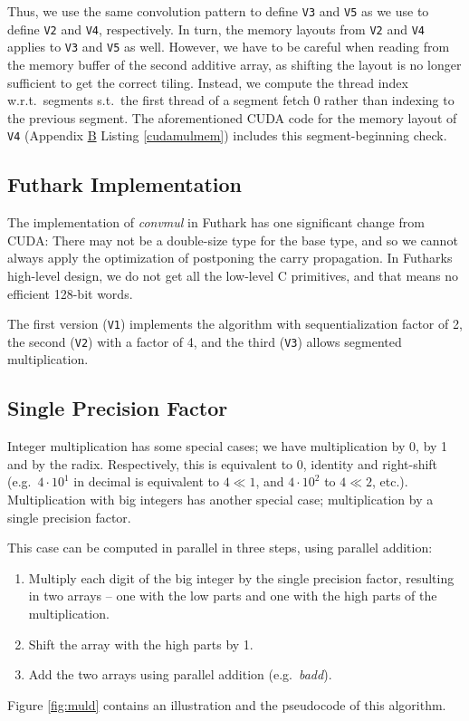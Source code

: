 Thus, we use the same convolution pattern to define \texttt{V3} and \texttt{V5}
as we use to define \texttt{V2} and \texttt{V4}, respectively. In turn, the
memory layouts from \texttt{V2} and \texttt{V4} applies to \texttt{V3} and
\texttt{V5} as well. However, we have to be careful when reading from the memory
buffer of the second additive array, as shifting the layout is no longer
sufficient to get the correct tiling. Instead, we compute the thread index
w.r.t.\ segments s.t.\ the first thread of a segment fetch $0$ rather than
indexing to the previous segment. The aforementioned CUDA code for the memory
layout of \texttt{V4} (Appendix \hyperref[app:B]{B} Listing \ref{cudamulmem})
includes this segment-beginning check.

\subsection{Futhark Implementation}
\label{subsec:mulfut}
{}

The implementation of \textit{convmul} in Futhark has one significant change
from CUDA: There may not be a double-size type for the base type, and so we
cannot always apply the optimization of postponing the carry propagation. In
Futharks high-level design, we do not get all the low-level C primitives, and
that means no efficient 128-bit words.

The first version (\texttt{V1}) implements the algorithm with sequentialization
factor of 2, the second (\texttt{V2}) with a factor of 4, and the third
(\texttt{V3}) allows segmented multiplication.

\subsection{Single Precision Factor}
\label{subsec:mulsin}

Integer multiplication has some special cases; we have multiplication by 0, by 1
and by the radix. Respectively, this is equivalent to 0, identity and
right-shift (e.g.\ $4 \cdot 10^1$ in decimal is equivalent to $4 \ll 1$, and
$4\cdot 10^2$ to $4\ll 2$, etc.). Multiplication with big integers has another special
case; multiplication by a single precision factor.

This case can be computed in parallel in three steps, using parallel addition:
\begin{enumerate}[label=\Roman*]
\item Multiply each digit of the big integer by the single precision factor,
  resulting in two arrays -- one with the low parts and one with the high parts
  of the multiplication.
\item Shift the array with the high parts by 1.
\item Add the two arrays using parallel addition (e.g.\ \textit{badd}).
\end{enumerate}
Figure \ref{fig:muld} contains an illustration and the pseudocode of this
algorithm.

